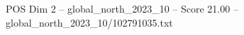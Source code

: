 \begin{textsample}{POS Dim 2 – global\_north\_2023\_10 – Score 21.00 – global\_north\_2023\_10/102791035.txt}
\end{textsample}
